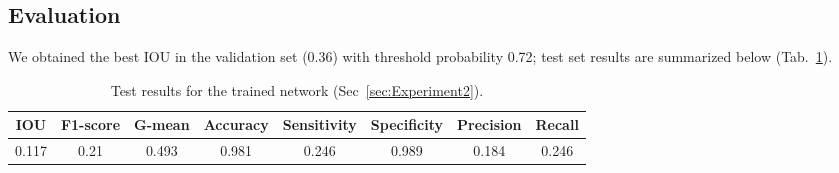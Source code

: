 \subsection{Evaluation}
We obtained the best IOU in the validation set (0.36) with threshold probability 0.72; test set results are summarized below (Tab.~\ref{tab:Results2}).
\begin{table}[h]
	\centering
	\begin{tabular}{cccccccc}
	\hline
	\textbf{IOU}	& \textbf{F1-score}	& \textbf{G-mean} &\textbf{Accuracy}	& \textbf{Sensitivity} & \textbf{Specificity} & \textbf{Precision} & \textbf{Recall}\\
	\hline
	 0.117 & 0.21 & 0.493 & 0.981 & 0.246 & 0.989 & 0.184 & 0.246 \\
	\hline
	\end{tabular}
	\caption[Results for Experiment 2]{Test results for the trained network (Sec~\ref{sec:Experiment2}).}
	\label{tab:Results2}
\end{table}

